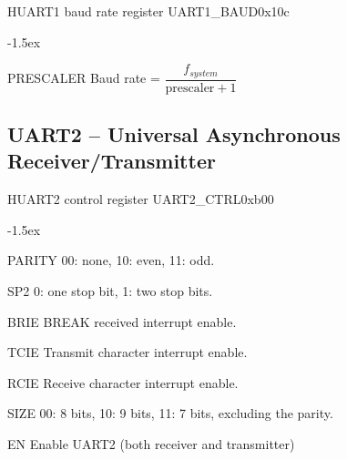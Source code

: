 \documentclass[12pt]{article}
\begin{document}
\begin{register}{H}{UART1 baud rate register UART1\_BAUD}{0x10c}
\label{uart1baud}
%
\regnewline%
\end{register}
\begin{regdesc}[0.6\textwidth]\begin{reglist}[000000000]
\itemsep-1.5ex
\item[PRESCALER] Baud rate = $\dfrac{f_{system}}{\textrm{prescaler}+1}$
\end{reglist}\end{regdesc}


\subsection{UART2 -- Universal Asynchronous Receiver/Transmitter}

\begin{register}{H}{UART2 control register UART2\_CTRL}{0xb00}
\label{uart2ctrl}
%
%
%
%
%
%
%
%
\regnewline%
\end{register}
\begin{regdesc}[0.75\textwidth]\begin{reglist}[000000]
\itemsep-1.5ex
\item[PARITY] 00: none, 10: even, 11: odd.
\item[SP2] 0: one stop bit, 1: two stop bits.
\item[BRIE] BREAK received interrupt enable.
\item[TCIE] Transmit character interrupt enable.
\item[RCIE] Receive character interrupt enable.
\item[SIZE] 00: 8 bits, 10: 9 bits, 11: 7 bits, excluding the parity.
\item[EN] Enable UART2 (both receiver and transmitter)
\end{reglist}\end{regdesc}
\end{document}
